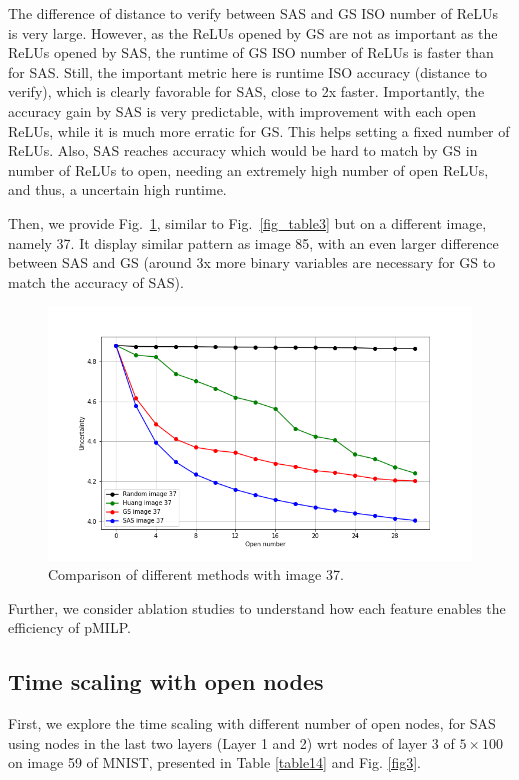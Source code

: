 The difference of distance to verify between SAS and GS ISO number of ReLUs is very large. However, as the ReLUs opened by GS are not as important as the ReLUs opened by SAS, the runtime of GS ISO number of ReLUs is faster than for SAS. Still, the important metric here is runtime ISO accuracy (distance to verify), which is clearly favorable for SAS, close to 2x faster. Importantly, the accuracy gain by SAS is very predictable, with improvement with each open ReLUs, while it is much more erratic for GS. This helps setting a fixed number of ReLUs. Also, SAS reaches accuracy which would be hard to match by GS in number of ReLUs to open, needing an extremely high number of open ReLUs, and thus, a uncertain high runtime.


Then, we provide Fig.~\ref{fig5}, similar to 
Fig.~\ref{fig_table3} but on a different image, namely 37.
It display similar pattern as image 85, with an even larger difference between SAS and GS (around 3x more binary variables are necessary for GS to match the accuracy of SAS).

\begin{figure}[h!]
	\hspace*{-1cm}
	\includegraphics[scale=0.55]{CNN-B-ADV_layer7_comparison_image37}
	\caption{Comparison of different methods with image 37.}
	\label{fig5}
\end{figure}


Further, we consider ablation studies to understand how each feature enables the efficiency of pMILP.

\subsection*{Time scaling with open nodes}	

First, we explore the time scaling with different number of open nodes, for SAS using nodes in the last two layers (Layer 1 and 2) wrt nodes of layer 3 of $5\times 100$ on image 59 of MNIST, presented in Table \ref{table14} and Fig. \ref{fig3}.





